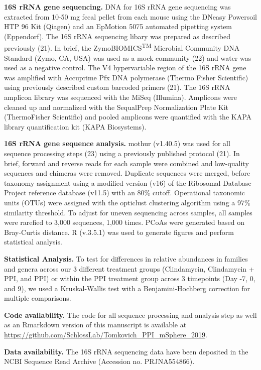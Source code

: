\documentclass[11pt,]{article}
\begin{document}
\textbf{16S rRNA gene sequencing.} DNA for 16S rRNA gene sequencing was
extracted from 10-50 mg fecal pellet from each mouse using the DNeasy
Powersoil HTP 96 Kit (Qiagen) and an EpMotion 5075 automated pipetting
system (Eppendorf). The 16S rRNA sequencing libary was prepared as
described previously (21). In brief, the ZymoBIOMICS\textsuperscript{TM}
Microbial Community DNA Standard (Zymo, CA, USA) was used as a mock
community (22) and water was used as a negative control. The V4
hypervariable region of the 16S rRNA gene was amplified with Accuprime
Pfx DNA polymerase (Thermo Fisher Scientific) using previously described
custom barcoded primers (21). The 16S rRNA amplicon library was
sequenced with the MiSeq (Illumina). Amplicons were cleaned up and
normalized with the SequalPrep Normalization Plate Kit (ThermoFisher
Scientific) and pooled amplicons were quantified with the KAPA library
quantification kit (KAPA Biosystems).

\textbf{16S rRNA gene sequence analysis.} mothur (v1.40.5) was used for
all sequence processing steps (23) using a previously published protocol
(21). In brief, forward and reverse reads for each sample were combined
and low-quality sequences and chimeras were removed. Duplicate sequences
were merged, before taxonomy assignment using a modified version (v16)
of the Ribosomal Database Project reference database (v11.5) with an
80\% cutoff. Operational taxonomic units (OTUs) were assigned with the
opticlust clustering algorithm using a 97\% similarity threshold. To
adjust for uneven sequencing across samples, all samples were rarefied
to 3,000 sequences, 1,000 times. PCoAs were generated based on
Bray-Curtis distance. R (v.3.5.1) was used to generate figures and
perform statistical analysis.

\textbf{Statistical Analysis.} To test for differences in relative
abundances in families and genera across our 3 different treatment
groups (Clindamycin, Clindamycin + PPI, and PPI) or within the PPI
treatment group across 3 timepoints (Day -7, 0, and 9), we used a
Kruskal-Wallis test with a Benjamini-Hochberg correction for multiple
comparisons.

\textbf{Code availability.} The code for all sequence processing and
analysis step as well as an Rmarkdown version of this manuscript is
available at
\url{https://github.com/SchlossLab/Tomkovich_PPI_mSphere_2019}.

\textbf{Data availability.} The 16S rRNA sequencing data have been
deposited in the NCBI Sequence Read Archive (Accession no. PRJNA554866).
\end{document}
